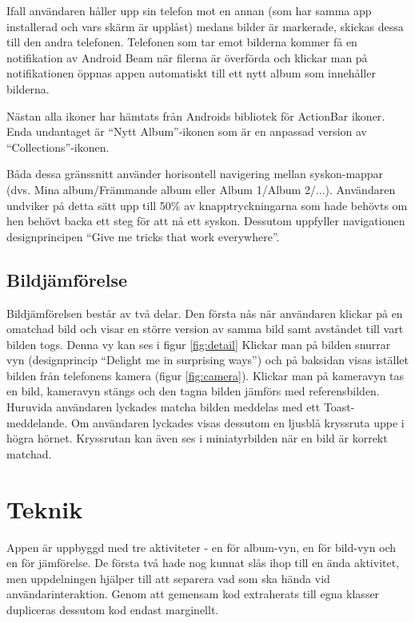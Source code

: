 \documentclass[11px, a4paper]{article}
\begin{document}
	Ifall användaren håller upp sin telefon mot en annan (som har samma app installerad och vars skärm är upplåst) medans bilder är markerade, skickas dessa till den andra telefonen. Telefonen som tar emot bilderna kommer få en notifikation av Android Beam när filerna är överförda och klickar man på notifikationen öppnas appen automatiskt till ett nytt album som innehåller bilderna.

	Nästan alla ikoner har hämtats från Androids bibliotek för ActionBar ikoner\cite{Icons}. Enda undantaget är ``Nytt Album''-ikonen som är en anpassad version av ``Collections''-ikonen.

	Båda dessa gränssnitt använder horisontell navigering mellan syskon-mappar (dvs. Mina album/Främmande album eller Album 1/Album 2/...). Användaren undviker på detta sätt upp till 50\% av knapptryckningarna som hade behövts om hen behövt backa ett steg för att nå ett syskon. Dessutom uppfyller navigationen designprincipen ``Give me tricks that work everywhere''\cite{Principles}.



\subsection{Bildjämförelse}
	Bildjämförelsen består av två delar. Den första nås när användaren klickar på en omatchad bild och visar en större version av samma bild samt avståndet till vart bilden togs. Denna vy kan ses i figur \ref{fig:detail} Klickar man på bilden snurrar vyn (designprincip ``Delight me in surprising ways''\cite{Principles}) och på baksidan visas istället bilden från telefonens kamera (figur \ref{fig:camera}). Klickar man på kameravyn tas en bild, kameravyn stängs och den tagna bilden jämförs med referensbilden. Huruvida användaren lyckades matcha bilden meddelas med ett Toast-meddelande. Om användaren lyckades visas dessutom en ljusblå kryssruta uppe i högra hörnet. Kryssrutan kan även ses i miniatyrbilden när en bild är korrekt matchad.


\section{Teknik}

	Appen är uppbyggd med tre aktiviteter - en för album-vyn, en för bild-vyn och en för jämförelse. De första två hade nog kunnat slås ihop till en ända aktivitet, men uppdelningen hjälper till att separera vad som ska hända vid användarinteraktion. Genom att gemensam kod extraherats till egna klasser dupliceras dessutom kod endast marginellt.
\end{document}
